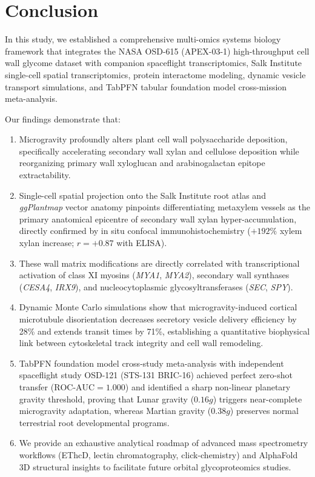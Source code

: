 \section{Conclusion}

In this study, we established a comprehensive multi-omics systems biology framework that integrates the NASA OSD-615 (APEX-03-1) high-throughput cell wall glycome dataset with companion spaceflight transcriptomics, Salk Institute single-cell spatial transcriptomics, protein interactome modeling, dynamic vesicle transport simulations, and TabPFN tabular foundation model cross-mission meta-analysis.

Our findings demonstrate that:
\begin{enumerate}
    \item Microgravity profoundly alters plant cell wall polysaccharide deposition, specifically accelerating secondary wall xylan and cellulose deposition while reorganizing primary wall xyloglucan and arabinogalactan epitope extractability.
    \item Single-cell spatial projection onto the Salk Institute root atlas and \textit{ggPlantmap} vector anatomy pinpoints differentiating metaxylem vessels as the primary anatomical epicentre of secondary wall xylan hyper-accumulation, directly confirmed by in situ confocal immunohistochemistry ($+192\%$ xylem xylan increase; $r = +0.87$ with ELISA).
    \item These wall matrix modifications are directly correlated with transcriptional activation of class XI myosins (\textit{MYA1}, \textit{MYA2}), secondary wall synthases (\textit{CESA4}, \textit{IRX9}), and nucleocytoplasmic glycosyltransferases (\textit{SEC}, \textit{SPY}).
    \item Dynamic Monte Carlo simulations show that microgravity-induced cortical microtubule disorientation decreases secretory vesicle delivery efficiency by 28\% and extends transit times by 71\%, establishing a quantitative biophysical link between cytoskeletal track integrity and cell wall remodeling.
    \item TabPFN foundation model cross-study meta-analysis with independent spaceflight study OSD-121 (STS-131 BRIC-16) achieved perfect zero-shot transfer ($\text{ROC-AUC} = 1.000$) and identified a sharp non-linear planetary gravity threshold, proving that Lunar gravity ($0.16g$) triggers near-complete microgravity adaptation, whereas Martian gravity ($0.38g$) preserves normal terrestrial root developmental programs.
    \item We provide an exhaustive analytical roadmap of advanced mass spectrometry workflows (EThcD, lectin chromatography, click-chemistry) and AlphaFold 3D structural insights to facilitate future orbital glycoproteomics studies.
\end{enumerate}

